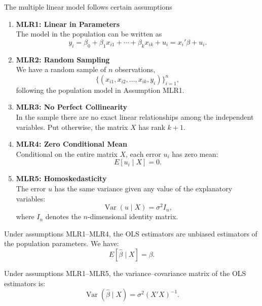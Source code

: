 The multiple linear model follows certain assumptions

\begin{enumerate}

    \item \textbf{MLR1: Linear in Parameters} \\
    The model in the population can be written as
    \[
        y_i = \beta_0 + \beta_1 x_{i1} + \cdots + \beta_k x_{ik} + u_i
        = x_i' \beta + u_i .
    \]

    \item \textbf{MLR2: Random Sampling} \\
    We have a random sample of $n$ observations,
    \[
        \{(x_{i1}, x_{i2}, \ldots, x_{ik}, y_i)\}_{i=1}^n,
    \]
    following the population model in Assumption MLR1.

    \item \textbf{MLR3: No Perfect Collinearity} \\
    In the sample there are no exact linear relationships among the independent variables.  
    Put otherwise, the matrix $X$ has rank $k+1$.

    \item \textbf{MLR4: Zero Conditional Mean} \\
    Conditional on the entire matrix $X$, each error $u_i$ has zero mean:
    \[
        E[u_i \mid X] = 0.
    \]

    \item \textbf{MLR5: Homoskedasticity} \\
    The error $u$ has the same variance given any value of the explanatory variables:
    \[
        \operatorname{Var}(u \mid X) = \sigma^2 I_n,
    \]
    where $I_n$ denotes the $n$-dimensional identity matrix.
\end{enumerate}

\vspace{20pt}
\begin{theorem}
Under assumptions MLR1--MLR4, the OLS estimators are unbiased estimators 
of the population parameters. We have:
\[
    E[\hat{\beta} \mid X] = \beta .
\]
\end{theorem}

\begin{theorem}
Under assumptions MLR1--MLR5, the variance--covariance matrix of the OLS 
estimators is:
\[
    \operatorname{Var}(\hat{\beta} \mid X)
    = \sigma^{2}(X'X)^{-1}.
\]
\end{theorem}

